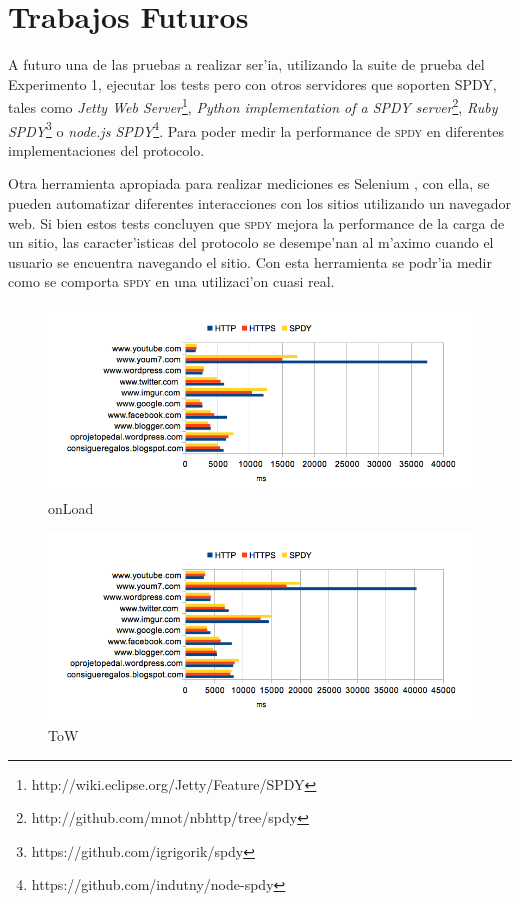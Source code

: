 \documentclass[a4paper,11pt,twocolumn]{article}
\begin{document}
\section{Trabajos Futuros}

A futuro una de las pruebas a realizar ser'ia, utilizando la suite de prueba del Experimento 1, ejecutar los tests pero con otros servidores que soporten SPDY, tales como \emph{Jetty Web Server}\footnote{http://wiki.eclipse.org/Jetty/Feature/SPDY}, \emph{Python implementation of a SPDY server}\footnote{http://github.com/mnot/nbhttp/tree/spdy}, \emph{Ruby SPDY}\footnote{https://github.com/igrigorik/spdy} o \emph{node.js SPDY}\footnote{https://github.com/indutny/node-spdy}. Para poder medir la performance de \textsc{spdy} en diferentes implementaciones del protocolo.

Otra herramienta apropiada para realizar mediciones es Selenium \cite{selenium}, con ella, se pueden automatizar diferentes interacciones con los sitios utilizando un navegador web. Si bien estos tests concluyen que \textsc{spdy} mejora la performance de la carga de un sitio, las caracter'isticas del protocolo se desempe'nan al m'aximo cuando el usuario se encuentra navegando el sitio. Con esta herramienta se podr'ia medir como se comporta \textsc{spdy} en una utilizaci'on cuasi real.

\begin{figure}[h]
  	\centering
	\includegraphics[scale=0.83]{exp2_2}
	\caption{\small onLoad}
	\label{graf8}
\end{figure}

\begin{figure}[h]
  	\centering
	\includegraphics[scale=0.83]{exp2_3}
	\caption{\small ToW}
	\label{graf9}
\end{figure}

\onecolumn

\nocite{*}

\end{document}
